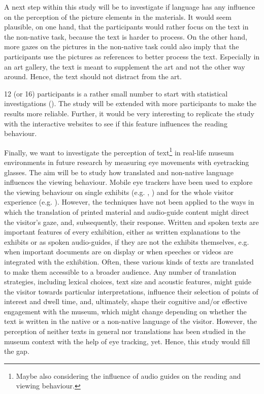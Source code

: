 \documentclass[output=paper]{langscibook}
\begin{document}
A next step within this study will be to investigate if language has any influence on the perception of the picture elements in the materials. It would seem plausible, on one hand, that the participants would rather focus on the text in the non-native task, because the text is harder to process. On the other hand, more gazes on the pictures in the non-native task could also imply that the participants use the pictures as references to better process the text. Especially in an art gallery, the text is meant to supplement the art and not the other way around. Hence, the text should not distract from the art. 


12 (or 16) participants is a rather small number to start with statistical investigations (\citealt{o2009eye}). The study will be extended with more participants to make the results more reliable. Further, it would be very interesting to replicate the study with the interactive websites to see if this feature influences the reading behaviour.

Finally, we want to investigate the perception of text\footnote{Maybe also considering the influence of audio guides on the reading and viewing behaviour.} in real-life museum environments in future research by measuring eye movements with eyetracking glasses. The aim will be to study how translated and non-native language influences the viewing behaviour. Mobile eye trackers have been used to explore the viewing behaviour on single exhibits (e.g. \citealt{walker2017looking}, \citealt{tatler2016looking}) and for the whole visitor experience (e.g. \citealt{eghbal2016use}). However, the techniques have not been applied to the ways in which the translation of printed material and audio-guide content might direct the visitor’s gaze, and, subsequently, their response. Written and spoken texts are important features of every exhibition, either as written explanations to the exhibits or as spoken audio-guides, if they are not the exhibits themselves, e.g. when important documents are on display or when speeches or videos are integrated with the exhibition. Often, these various kinds of texts are translated to make them accessible to a broader audience. Any number of translation strategies, including lexical choices, text size and acoustic features, might guide the visitor towards particular interpretations, influence their selection of points of interest and dwell time, and, ultimately, shape their cognitive and/or effective engagement with the museum, which might change depending on whether the text is written in the native or a non-native language of the visitor. However, the perception of neither texts in general nor translations has been studied in the museum context with the help of eye tracking, yet. Hence, this study would fill the gap.

{\sloppy\printbibliography[heading=subbibliography,notkeyword=this]}
\end{document}
